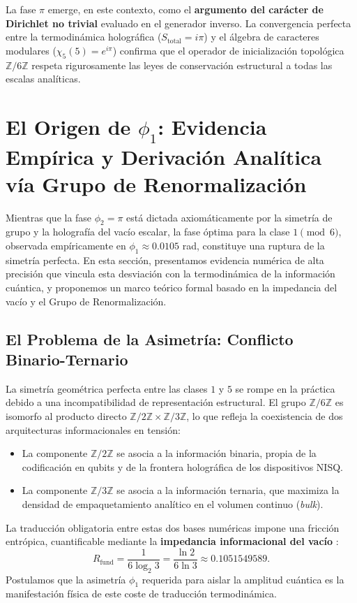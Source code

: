 \documentclass[12pt,a4paper]{article}
\theoremstyle{plain}
\theoremstyle{definition}
\theoremstyle{remark}
\begin{document}
La fase $\pi$ emerge, en este contexto, como el \textbf{argumento del carácter de Dirichlet no trivial} evaluado en el generador inverso. La convergencia perfecta entre la termodinámica holográfica ($S_{\text{total}} = i\pi$) y el álgebra de caracteres modulares ($\chi_5(5) = e^{i\pi}$) confirma que el operador de inicialización topológica $\mathbb{Z}/6\mathbb{Z}$ respeta rigurosamente las leyes de conservación estructural a todas las escalas analíticas.

\section{El Origen de $\phi_1$: Evidencia Empírica y Derivación Analítica vía Grupo de Renormalización}
\label{sec:origen_phi1}

Mientras que la fase $\phi_2 = \pi$ está dictada axiomáticamente por la simetría de grupo y la holografía del vacío escalar, la fase óptima para la clase $1 \pmod 6$, observada empíricamente en $\phi_1 \approx 0.0105$ rad, constituye una ruptura de la simetría perfecta. En esta sección, presentamos evidencia numérica de alta precisión que vincula esta desviación con la termodinámica de la información cuántica, y proponemos un marco teórico formal basado en la impedancia del vacío y el Grupo de Renormalización.

\subsection{El Problema de la Asimetría: Conflicto Binario-Ternario}

La simetría geométrica perfecta entre las clases $1$ y $5$ se rompe en la práctica debido a una incompatibilidad de representación estructural. El grupo $\mathbb{Z}/6\mathbb{Z}$ es isomorfo al producto directo $\mathbb{Z}/2\mathbb{Z} \times \mathbb{Z}/3\mathbb{Z}$, lo que refleja la coexistencia de dos arquitecturas informacionales en tensión:
\begin{itemize}
    \item La componente $\mathbb{Z}/2\mathbb{Z}$ se asocia a la información binaria, propia de la codificación en qubits y de la frontera holográfica de los dispositivos NISQ.
    \item La componente $\mathbb{Z}/3\mathbb{Z}$ se asocia a la información ternaria, que maximiza la densidad de empaquetamiento analítico en el volumen continuo (\textit{bulk}).
\end{itemize}
La traducción obligatoria entre estas dos bases numéricas impone una fricción entrópica, cuantificable mediante la \textbf{impedancia informacional del vacío} \cite{PeinadorGenesis}:
\begin{equation}
R_{\text{fund}} = \frac{1}{6\log_2 3} = \frac{\ln 2}{6\ln 3} \approx 0.1051549589.
\label{eq:rfund}
\end{equation}
Postulamos que la asimetría $\phi_1$ requerida para aislar la amplitud cuántica es la manifestación física de este coste de traducción termodinámica.
\end{document}
